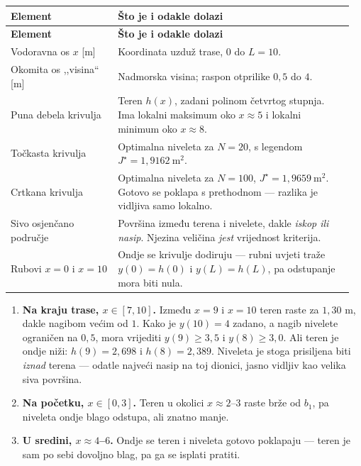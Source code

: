 \begin{longtable}{@{}p{0.30\linewidth} p{0.66\linewidth}@{}}
\toprule
\textbf{Element} & \textbf{Što je i odakle dolazi} \\
\midrule
\endfirsthead
\toprule
\textbf{Element} & \textbf{Što je i odakle dolazi} \\
\midrule
\endhead
Vodoravna os $x$ [m] & Koordinata uzduž trase, $0$ do $L = 10$. \\[5pt]
Okomita os ,,visina`` [m] & Nadmorska visina; raspon otprilike $0{,}5$ do $4$. \\[5pt]
Puna debela krivulja & Teren $h(x)$, zadani polinom četvrtog stupnja. Ima lokalni
maksimum oko $x \approx 5$ i lokalni minimum oko $x \approx 8$. \\[5pt]
Točkasta krivulja & Optimalna niveleta za $N = 20$, s legendom
$J^{\star} = 1{,}9162\ \mathrm{m}^2$. \\[5pt]
Crtkana krivulja & Optimalna niveleta za $N = 100$,
$J^{\star} = 1{,}9659\ \mathrm{m}^2$. Gotovo se poklapa s prethodnom --- razlika
je vidljiva samo lokalno. \\[5pt]
Sivo osjenčano područje & Površina između terena i nivelete, dakle
\emph{iskop ili nasip}. Njezina veličina \emph{jest} vrijednost kriterija. \\[5pt]
Rubovi $x = 0$ i $x = 10$ & Ondje se krivulje dodiruju --- rubni uvjeti traže
$y(0) = h(0)$ i $y(L) = h(L)$, pa odstupanje mora biti nula. \\
\bottomrule
\end{longtable}

\begin{korak}
\begin{enumerate}[leftmargin=*]
  \item \textbf{Na kraju trase, $x \in [7, 10]$.} Između $x = 9$ i $x = 10$ teren
        raste za $1{,}30$ m, dakle nagibom većim od $1$. Kako je $y(10) = 4$
        zadano, a nagib nivelete ograničen na $0{,}5$, mora vrijediti
        $y(9) \geq 3{,}5$ i $y(8) \geq 3{,}0$. Ali teren je ondje niži:
        $h(9) = 2{,}698$ i $h(8) = 2{,}389$. Niveleta je stoga prisiljena biti
        \emph{iznad} terena --- odatle najveći nasip na toj dionici, jasno
        vidljiv kao velika siva površina.
  \item \textbf{Na početku, $x \in [0, 3]$.} Teren u okolici $x \approx 2$--$3$
        raste brže od $b_1$, pa niveleta ondje blago odstupa, ali znatno manje.
  \item \textbf{U sredini, $x \approx 4$--$6$.} Ondje se teren i niveleta gotovo
        poklapaju --- teren je sam po sebi dovoljno blag, pa ga se isplati
        pratiti.
\end{enumerate}
\end{korak}

